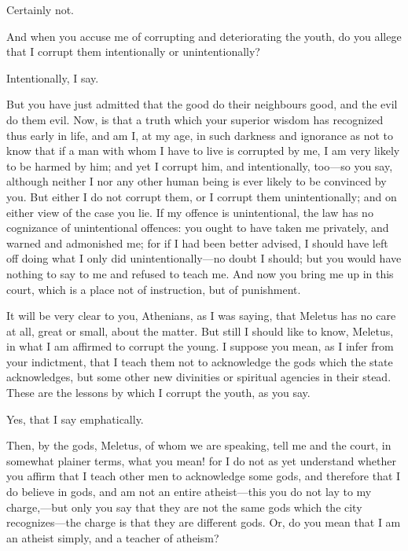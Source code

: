 \documentclass[11pt,letter]{article}
\begin{document}
\par  Certainly not.

\par  And when you accuse me of corrupting and deteriorating the youth, do you allege that I corrupt them intentionally or unintentionally?

\par  Intentionally, I say.

\par  But you have just admitted that the good do their neighbours good, and the evil do them evil. Now, is that a truth which your superior wisdom has recognized thus early in life, and am I, at my age, in such darkness and ignorance as not to know that if a man with whom I have to live is corrupted by me, I am very likely to be harmed by him; and yet I corrupt him, and intentionally, too—so you say, although neither I nor any other human being is ever likely to be convinced by you. But either I do not corrupt them, or I corrupt them unintentionally; and on either view of the case you lie. If my offence is unintentional, the law has no cognizance of unintentional offences: you ought to have taken me privately, and warned and admonished me; for if I had been better advised, I should have left off doing what I only did unintentionally—no doubt I should; but you would have nothing to say to me and refused to teach me. And now you bring me up in this court, which is a place not of instruction, but of punishment.

\par  It will be very clear to you, Athenians, as I was saying, that Meletus has no care at all, great or small, about the matter. But still I should like to know, Meletus, in what I am affirmed to corrupt the young. I suppose you mean, as I infer from your indictment, that I teach them not to acknowledge the gods which the state acknowledges, but some other new divinities or spiritual agencies in their stead. These are the lessons by which I corrupt the youth, as you say.

\par  Yes, that I say emphatically.

\par  Then, by the gods, Meletus, of whom we are speaking, tell me and the court, in somewhat plainer terms, what you mean! for I do not as yet understand whether you affirm that I teach other men to acknowledge some gods, and therefore that I do believe in gods, and am not an entire atheist—this you do not lay to my charge,—but only you say that they are not the same gods which the city recognizes—the charge is that they are different gods. Or, do you mean that I am an atheist simply, and a teacher of atheism?
\end{document}
